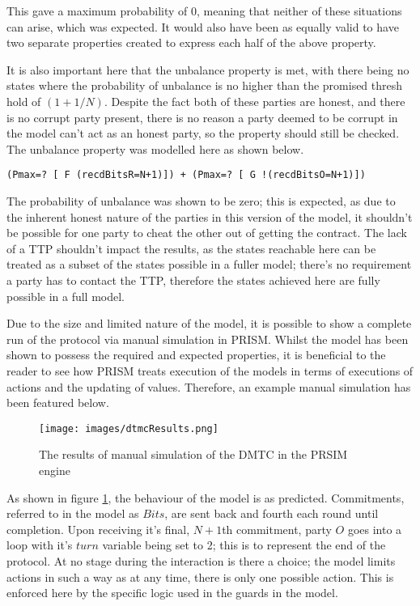 \documentclass{l4proj}
\begin{document}
This gave a maximum probability of 0, meaning that neither of these situations can arise, which was expected. It would also have been as equally valid to have two separate properties created to express each half of the above property.


It is also important here that the unbalance property is met, with there being no states where the probability of unbalance is no higher than the promised thresh hold of $(1+1/N)$. Despite the fact both of these parties are honest, and there is no corrupt party present, there is no reason a party deemed to be corrupt in the model can't act as an honest party, so the property should still be checked. The unbalance property was modelled here as shown below.

\begin{lstlisting}
(Pmax=? [ F (recdBitsR=N+1)]) + (Pmax=? [ G !(recdBitsO=N+1)])
\end{lstlisting}

The probability of unbalance was shown to be zero; this is expected, as due to the inherent honest nature of the parties in this version of the model, it shouldn't be possible for one party to cheat the other out of getting the contract. The lack of a TTP shouldn't impact the results, as the states reachable here can be treated as a subset of the states possible in a fuller model; there's no requirement a party has to contact the TTP, therefore the states achieved here are fully possible in a full model.

Due to the size and limited nature of the model, it is possible to show a complete run of the protocol via manual simulation in PRISM. Whilst the model has been shown to possess the required and expected properties, it is beneficial to the reader to see how PRISM treats execution of the models in terms of executions of actions and the updating of values. Therefore, an example manual simulation has been featured below.

\begin{figure}[ht!]
\centering
\texttt{[image: images/dtmcResults.png]}
\caption{The results of manual simulation of the DMTC in the PRSIM engine}
\label{dtmcEx}
\end{figure}

As shown in figure \ref{dtmcEx}, the behaviour of the model is as predicted. Commitments, referred to in the model as $Bits$, are sent back and fourth each round until completion. Upon receiving it's final, $N+1$th commitment, party $O$ goes into a loop with it's $turn$ variable being set to 2; this is to represent the end of the protocol. 
At no stage during the interaction is there a choice; the model limits actions in such a way as at any time, there is only one possible action. This is enforced here by the specific logic used in the guards in the model.
\end{document}
